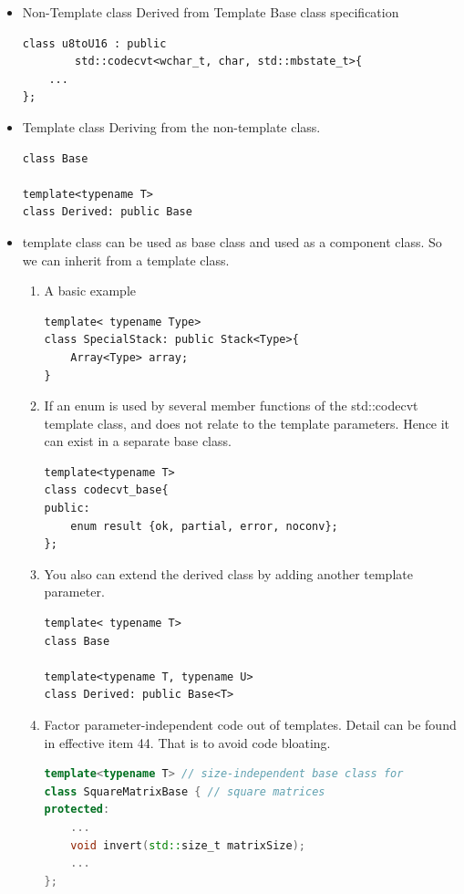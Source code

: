 \documentclass[a4paper,11pt,twoside]{book}
\begin{document}
\begin{itemize}
	
	\item Non-Template class Derived from Template Base class specification

\begin{lstlisting}[numbers=none]
class u8toU16 : public 
		std::codecvt<wchar_t, char, std::mbstate_t>{
	...
};
\end{lstlisting}

	\item Template class Deriving from the non-template class.
\begin{lstlisting}[numbers=none]
class Base
	
template<typename T>
class Derived: public Base
\end{lstlisting}	
	
	\item template class can be used as base class and used as a component class. So we can inherit from a template class.
\begin{enumerate}
	\item A basic example
\begin{lstlisting}[numbers=none]
template< typename Type>
class SpecialStack: public Stack<Type>{
	Array<Type> array;
}
\end{lstlisting}	
	
	\item If an enum is used by several member functions of the std::codecvt template class, and does not relate to the template parameters. Hence it can exist in a separate base class.
	
\begin{lstlisting}[numbers=none]
template<typename T>
class codecvt_base{
public:
	enum result {ok, partial, error, noconv};
};
\end{lstlisting}
	
	\item You also can extend the derived class by adding another template parameter.
\begin{lstlisting}[numbers=none]
template< typename T>
class Base
	
template<typename T, typename U>
class Derived: public Base<T>
\end{lstlisting}
	
	
	\item Factor parameter-independent code out of templates. Detail can be found in effective item 44. That is to avoid code bloating.
\begin{lstlisting}[frame=single, language=c++]
template<typename T> // size-independent base class for
class SquareMatrixBase { // square matrices
protected:
	...
	void invert(std::size_t matrixSize); 
	...
};
	

\end{lstlisting}
\end{enumerate}
\end{itemize}
\end{document}
